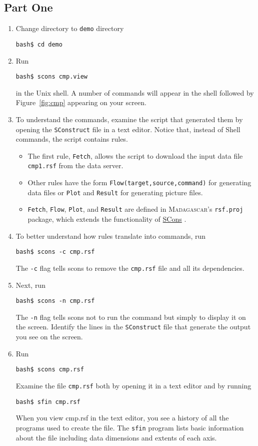\subsection{Part One}
\begin{enumerate}
\item Change directory to \texttt{demo} directory
\begin{verbatim}
bash$ cd demo
\end{verbatim}
\item Run
\begin{verbatim}
bash$ scons cmp.view
\end{verbatim}
in the Unix shell. A number of commands will appear in the shell followed by Figure~\ref{fig:cmp} appearing on your screen. 
\item To understand the commands, examine the script that generated them by opening the \texttt{SConstruct} file in a text editor. Notice that, instead of Shell commands, the script contains rules. 
\begin{itemize}
\item The first rule, \texttt{Fetch}, allows the script to download the input data file \texttt{cmp1.rsf} from the data server. 
\item Other rules have the form \texttt{Flow(target,source,command)} for generating data files or \texttt{Plot} and  \texttt{Result} for 
generating picture files. 
\item \texttt{Fetch}, \texttt{Flow}, \texttt{Plot}, and \texttt{Result} are defined in \textsc{Madagascar}'s \texttt{rsf.proj} package, which extends the functionality of \href{http://www.scons.org}{SCons}
.
\end{itemize}
\item To better understand how rules translate into commands, run 
\begin{verbatim}
bash$ scons -c cmp.rsf
\end{verbatim}
The \texttt{-c} flag tells scons to remove the \texttt{cmp.rsf} file and all its dependencies.
\item Next, run
\begin{verbatim}
bash$ scons -n cmp.rsf
\end{verbatim}
The \texttt{-n} flag tells scons not to run the command but simply to display it on the screen. Identify the lines in the \texttt{SConstruct} file that generate the output you see on the screen.
\item Run
\begin{verbatim}
bash$ scons cmp.rsf
\end{verbatim}
Examine the file \texttt{cmp.rsf} both by opening it in a text editor and by running
\begin{verbatim}
bash$ sfin cmp.rsf
\end{verbatim}

When you view cmp.rsf in the text editor, you see a history of all the programs used to create the file. The \texttt{sfin} program lists basic information about the file including data dimensions and extents of each axis.
\end{enumerate}

